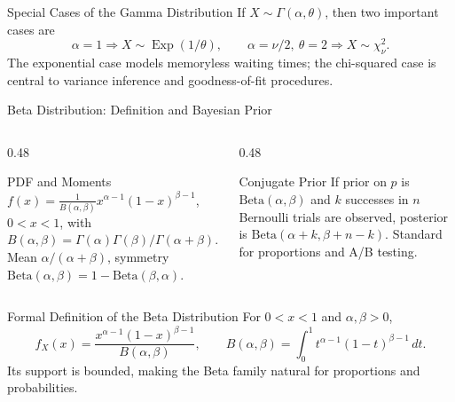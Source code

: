 \documentclass[aspectratio=169,xcolor={dvipsnames,table}]{beamer}
\begin{document}
\begin{frame}{Special Cases of the Gamma Distribution}
\scriptsize
If $X\sim\Gamma(\alpha,\theta)$, then two important cases are
\[
\alpha=1\Rightarrow X\sim\operatorname{Exp}(1/\theta),
\qquad
\alpha=\nu/2,\ \theta=2\Rightarrow X\sim\chi^2_{\nu}.
\]
The exponential case models memoryless waiting times; the chi-squared case is
central to variance inference and goodness-of-fit procedures.
\end{frame}

\begin{frame}{Beta Distribution: Definition and Bayesian Prior}
	\vspace{-0.15cm}
	\begin{columns}[T]
		\begin{column}{0.48\textwidth}
			\begin{block}{PDF and Moments}
				\footnotesize
				$f(x) = \frac{1}{B(\alpha,\beta)}x^{\alpha-1}(1-x)^{\beta-1}$, $0<x<1$, with $B(\alpha,\beta)=\Gamma(\alpha)\Gamma(\beta)/\Gamma(\alpha+\beta)$. Mean $\alpha/(\alpha+\beta)$, symmetry $\text{Beta}(\alpha,\beta)=1-\text{Beta}(\beta,\alpha)$.
			\end{block}
		\end{column}
		\begin{column}{0.48\textwidth}
			\begin{alertblock}{Conjugate Prior}
				\footnotesize
				If prior on $p$ is $\text{Beta}(\alpha,\beta)$ and $k$ successes in $n$ Bernoulli trials are observed, posterior is $\text{Beta}(\alpha+k,\beta+n-k)$. Standard for proportions and A/B testing.
			\end{alertblock}
		\end{column}
	\end{columns}
\end{frame}

\begin{frame}{Formal Definition of the Beta Distribution}
\scriptsize
For $0<x<1$ and $\alpha,\beta>0$,
\[
f_X(x)=\frac{x^{\alpha-1}(1-x)^{\beta-1}}{B(\alpha,\beta)},
\qquad
B(\alpha,\beta)=\int_0^1t^{\alpha-1}(1-t)^{\beta-1}\,dt.
\]
Its support is bounded, making the Beta family natural for proportions and
probabilities.
\end{frame}
\end{document}
